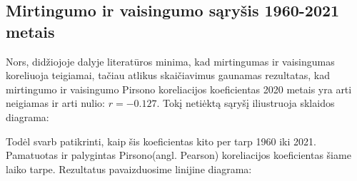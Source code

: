 \subsection{Mirtingumo ir vaisingumo sąryšis 1960-2021 metais}
Nors, didžiojoje dalyje literatūros minima, kad mirtingumas ir vaisingumas koreliuoja teigiamai, tačiau atlikus skaičiavimus gaunamas rezultatas, kad mirtingumo ir vaisingumo Pirsono koreliacijos koeficientas 2020 metais yra arti neigiamas ir arti nulio: $r = -0.127$. Tokį netiėktą sąryšį iliustruoja sklaidos diagrama:

Todėl svarb patikrinti, kaip šis koeficientas kito per tarp 1960 iki 2021. Pamatuotas ir palygintas Pirsono(angl. Pearson) koreliacijos koeficientas šiame laiko tarpe. Rezultatus pavaizduosime linijine diagrama:
